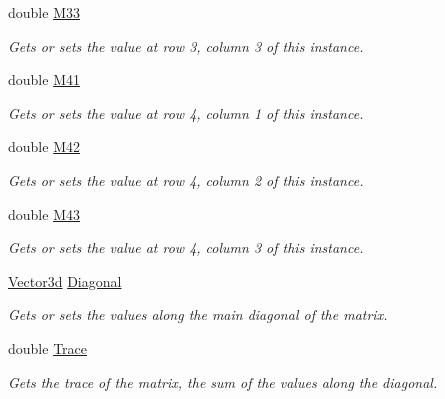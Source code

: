 \begin{DoxyCompactItemize}
double \hyperlink{struct_open_t_k_1_1_matrix4x3d_a33afc463d9e3b788d1a900202e500147}{M33}
\begin{DoxyCompactList}\small\item\em Gets or sets the value at row 3, column 3 of this instance. \end{DoxyCompactList}\item 
double \hyperlink{struct_open_t_k_1_1_matrix4x3d_aa40c8a9d772a780b125c3ba19dc58070}{M41}
\begin{DoxyCompactList}\small\item\em Gets or sets the value at row 4, column 1 of this instance. \end{DoxyCompactList}\item 
double \hyperlink{struct_open_t_k_1_1_matrix4x3d_ac5a37fab15654e6f5ac6c7f088eebec1}{M42}
\begin{DoxyCompactList}\small\item\em Gets or sets the value at row 4, column 2 of this instance. \end{DoxyCompactList}\item 
double \hyperlink{struct_open_t_k_1_1_matrix4x3d_a5c33c559ab02ab1463c601539507b242}{M43}
\begin{DoxyCompactList}\small\item\em Gets or sets the value at row 4, column 3 of this instance. \end{DoxyCompactList}\item 
\hyperlink{struct_open_t_k_1_1_vector3d}{Vector3d} \hyperlink{struct_open_t_k_1_1_matrix4x3d_a516d7a3e891262f6cf1406b615619cb4}{Diagonal}
\begin{DoxyCompactList}\small\item\em Gets or sets the values along the main diagonal of the matrix. \end{DoxyCompactList}\item 
double \hyperlink{struct_open_t_k_1_1_matrix4x3d_aff4c9982503c4a88a031aa05e0aa28dc}{Trace}
\begin{DoxyCompactList}\small\item\em Gets the trace of the matrix, the sum of the values along the diagonal. \end{DoxyCompactList}\item 

\end{DoxyCompactItemize}

